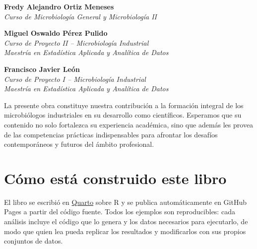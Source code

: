 \documentclass[
  spanish,
  letterpaper,
  DIV=11,
  numbers=noendperiod]{scrreprt}
\begin{document}
\textbf{Fredy Alejandro Ortiz Meneses}\\
\emph{Curso de Microbiología General y Microbiología II}

\textbf{Miguel Oswaldo Pérez Pulido}\\
\emph{Curso de Proyecto II -- Microbiología Industrial\\
Maestría en Estadística Aplicada y Analítica de Datos}

\textbf{Francisco Javier León}\\
\emph{Curso de Proyecto I -- Microbiología Industrial\\
Maestría en Estadística Aplicada y Analítica de Datos}

\begin{tcolorbox}[enhanced jigsaw, colback=white, breakable, toptitle=1mm, toprule=.15mm, colbacktitle=quarto-callout-tip-color!10!white, bottomrule=.15mm, coltitle=black, titlerule=0mm, opacityback=0, leftrule=.75mm, bottomtitle=1mm, colframe=quarto-callout-tip-color-frame, left=2mm, title=\textcolor{quarto-callout-tip-color}{\faLightbulb}\hspace{0.5em}{Lo que significa este libro}, rightrule=.15mm, opacitybacktitle=0.6, arc=.35mm]

La presente obra constituye nuestra contribución a la formación integral
de los microbiólogos industriales en su desarrollo como científicos.
Esperamos que su contenido no solo fortalezca su experiencia académica,
sino que además les provea de las competencias prácticas indispensables
para afrontar los desafíos contemporáneos y futuros del ámbito
profesional.

\end{tcolorbox}

\section*{Cómo está construido este
libro}\label{cuxf3mo-estuxe1-construido-este-libro}


El libro se escribió en \href{https://quarto.org}{Quarto} sobre R y se
publica automáticamente en GitHub Pages a partir del código fuente.
Todos los ejemplos son reproducibles: cada análisis incluye el código
que lo genera y los datos necesarios para ejecutarlo, de modo que quien
lea pueda replicar los resultados y modificarlos con sus propios
conjuntos de datos.
\end{document}
